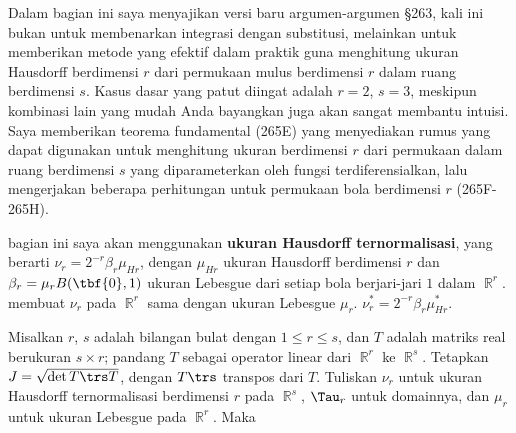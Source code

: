 
\def\chaptername{Perubahan variabel dalam integral}
\def\sectionname{Ukuran permukaan}


Dalam bagian ini saya menyajikan versi baru argumen-argumen \S263, kali
ini bukan untuk membenarkan integrasi dengan substitusi, melainkan untuk
memberikan metode yang efektif dalam praktik guna menghitung ukuran
Hausdorff berdimensi $r$ dari permukaan mulus berdimensi $r$ dalam ruang
berdimensi $s$. Kasus dasar yang patut diingat adalah $r=2$, $s=3$,
meskipun kombinasi lain yang mudah Anda bayangkan juga akan sangat
membantu intuisi. Saya memberikan teorema fundamental (265E) yang
menyediakan rumus yang dapat digunakan untuk menghitung ukuran
berdimensi $r$ dari permukaan dalam ruang berdimensi $s$ yang
diparameterkan oleh fungsi terdiferensialkan, lalu mengerjakan beberapa
perhitungan untuk permukaan bola berdimensi $r$ (265F-265H). %

bagian ini saya akan menggunakan {\bf ukuran Hausdorff ternormalisasi},
yang berarti $\nu_r=2^{-r}\beta_r\mu_{Hr}$, dengan $\mu_{Hr}$ ukuran
Hausdorff berdimensi $r$ dan $\beta_r=\mu_rB(\tbf{0},1)$ ukuran Lebesgue dari
setiap bola berjari-jari $1$ dalam $\BbbR^r$.   membuat $\nu_r$ pada
$\BbbR^r$ sama dengan ukuran Lebesgue $\mu_r$.
$\nu_r^*=2^{-r}\beta_r\mu_{Hr}^*$.

 Misalkan $r$, $s$ adalah bilangan bulat dengan
$1\le r\le s$, dan $T$ adalah matriks real berukuran $s\times r$;
pandang $T$ sebagai operator linear dari $\BbbR^r$ ke $\BbbR^s$.
Tetapkan $J=\sqrt{\det T\trs T}$, dengan $T\trs $ transpos dari $T$.
Tuliskan $\nu_r$ untuk ukuran Hausdorff ternormalisasi berdimensi $r$
pada $\BbbR^s$, $\Tau_r$ untuk domainnya, dan $\mu_r$ untuk ukuran
Lebesgue pada $\BbbR^r$. Maka

